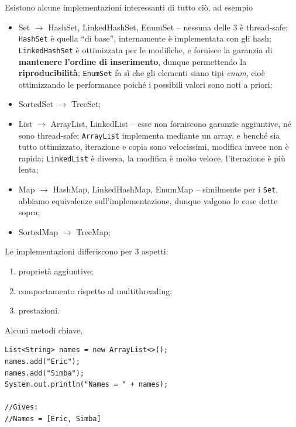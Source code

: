 \documentclass[\fontsizeclass,twocolumn]{\classname}
\theoremstyle{definition}
\theoremstyle{definition}
\begin{document}
Esistono alcune implementazioni interessanti di tutto ciò, ad esempio
\begin{itemize}
    \item Set $\rightarrow$ HashSet, LinkedHashSet, EnumSet -- nessuna delle 3
        è thread\--safe; \texttt{HashSet} è quella ``di base'', internamente è
        implementata con gli hash; \texttt{LinkedHashSet} è ottimizzata per le
        modifiche, e fornisce la garanzia di \textbf{mantenere l'ordine di
        inserimento}, dunque permettendo la \textbf{riproducibilità};
        \texttt{EnumSet} fa sì che gli elementi siano tipi \emph{enum}, cioè
        ottimizzando le performance poiché i possibili valori sono noti a
        priori;
    \item SortedSet $\rightarrow$ TreeSet;
    \item List $\rightarrow$ ArrayList, LinkedList -- esse non forniscono
        garanzie aggiuntive, né sono thread\--safe; \texttt{ArrayList}
        implementa mediante un array, e benché sia tutto ottimizzato,
        iterazione e copia sono velocissimi, modifica invece non è rapida;
        \texttt{LinkedList} è diversa, la modifica è molto veloce, l'iterazione
        è più lenta;
    \item Map $\rightarrow$ HashMap, LinkedHashMap, EnumMap -- similmente per i
        \texttt{Set}, abbiamo equivalenze sull'implementazione, dunque valgono
        le cose dette sopra;
    \item SortedMap $\rightarrow$ TreeMap;
\end{itemize}

Le implementazioni differiscono per 3 aspetti:
\begin{enumerate}
    \item proprietà aggiuntive;
    \item comportamento rispetto al multithreading;
    \item prestazioni.
\end{enumerate}


Alcuni metodi chiave,

\begin{lstlisting}
List<String> names = new ArrayList<>();
names.add("Eric");
names.add("Simba");
System.out.println("Names = " + names);

//Gives:
//Names = [Eric, Simba]
\end{lstlisting}
\end{document}
